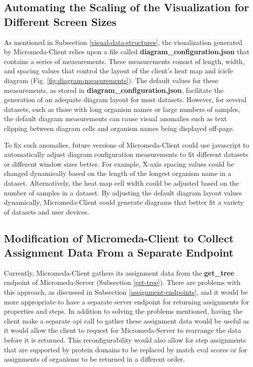\subsection{Automating the Scaling of the Visualization for Different Screen 
Sizes}

As mentioned in Subsection \ref{visual-data-structures}, the visualization 
generated by Micromeda-Client relies upon a file called 
\textbf{diagram\_configuration.json} that contains a series of measurements. 
These measurements consist of length, width, and spacing values that control the 
layout of the client's heat map and icicle diagram (Fig. 
\ref{fig:diagram-measurements}). The default values for these measurements, as 
stored in \textbf{diagram\_configuration.json}, facilitate the generation of an 
adequate diagram layout for most datasets. However, for several datasets, such 
as those with long organism names or large numbers of samples, the default 
diagram measurements can cause visual anomalies such as text clipping between 
diagram cells and organism names being displayed off-page.

To fix such anomalies, future versions of Micromeda-Client could use 
\gls{javascript} to automatically adjust diagram configuration measurements to 
fit different datasets or different window sizes better. For example, X-axis 
spacing values could be changed dynamically based on the length of the longest 
organism name in a dataset. Alternatively, the heat map cell width could be 
adjusted based on the number of samples in a dataset. By adjusting the default 
diagram layout values dynamically, Micromeda-Client could generate diagrams that 
better fit a variety of datasets and user devices.

\subsection{Modification of Micromeda-Client to Collect Assignment Data From a 
Separate Endpoint}

Currently, Micromeda-Client gathers its assignment data from the 
\textbf{get\_tree} endpoint of Micromeda-Server (Subsection \ref{get-tree}). 
There are problems with this approach, as discussed in Subsection 
\ref{assignment-endpoints}, and it would be more appropriate to have a separate 
server endpoint for returning assignments for properties and steps. In addition 
to solving the problems mentioned, having the client make a separate \gls{api} 
call to gather these assignment data would be useful as it would allow the client 
to request for Micromeda-Server to rearrange the data before it is returned. 
This reconfigurability would also allow for step assignments that are supported 
by protein domains to be replaced by match \gls{eval} scores or for assignments 
of organisms to be returned in a different order.


